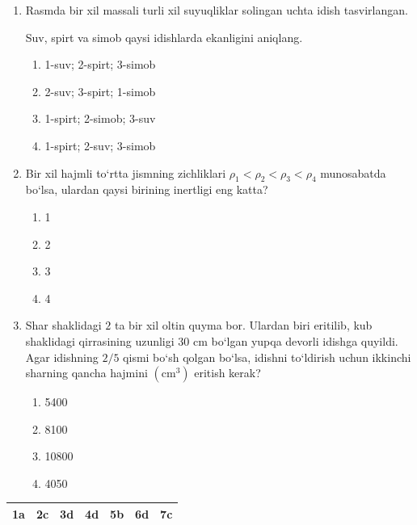 \begin{enumerate}
\item Rasmda bir xil massali turli xil suyuqliklar
solingan uchta idish tasvirlangan.

Suv, spirt va simob qaysi idishlarda ekanligini aniqlang.


\begin{enumerate}[label=\Alph*)]
\item 1-suv; 2-spirt; 3-simob
\item 2-suv; 3-spirt; 1-simob
\item 1-spirt; 2-simob; 3-suv
\item 1-spirt; 2-suv; 3-simob

\end{enumerate}


\item Bir xil hajmli to‘rtta jismning zichliklari
$\rho_1 < \rho_2 < \rho_3 < \rho_4$ munosabatda bo‘lsa,
ulardan qaysi birining inertligi eng katta?

\begin{enumerate}[label=\Alph*)]
\item 1
\item 2
\item 3
\item 4
\end{enumerate}


\item Shar shaklidagi $2$ ta bir xil oltin quyma bor.
Ulardan biri eritilib, kub shaklidagi qirrasining uzunligi $30$ cm bo‘lgan yupqa devorli idishga quyildi.
Agar idishning $2/5$ qismi bo‘sh qolgan bo‘lsa,
idishni to‘ldirish uchun ikkinchi sharning
qancha hajmini $(\text{cm}^3)$ eritish kerak?

\begin{enumerate}[label=\Alph*)]
\item 5400
\item 8100
\item 10800
\item 4050
\end{enumerate}

\end{enumerate}

\begin{table}[ht]
\centering
\begin{tabular}{|c|c|c|c|c|c|c|}
\hline
1a & 2c & 3d & 4d & 5b & 6d & 7c \\ \hline
\end{tabular}
\end{table}

